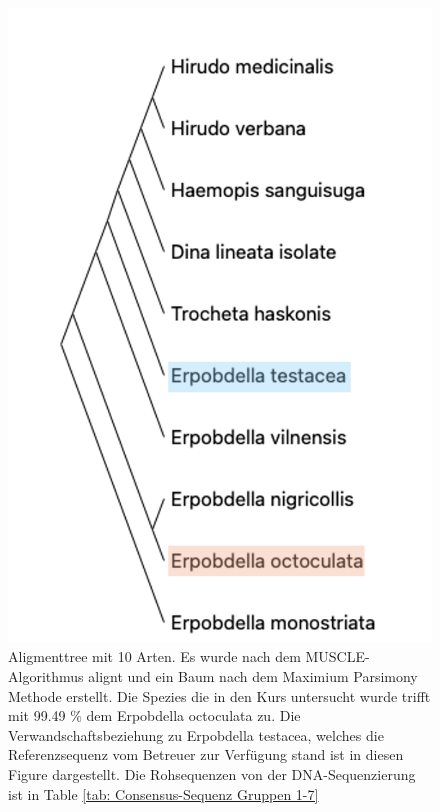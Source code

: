 \documentclass[oneside,10pt,a4paper]{report}
\begin{document}
				\begin{figure}[H]
					\centering
					\includegraphics[scale=0.7]{Anhs Tree.png}
					\caption{Aligmenttree mit 10 Arten. Es wurde nach dem MUSCLE-Algorithmus alignt und ein Baum nach dem Maximium Parsimony Methode erstellt. Die Spezies die in den Kurs untersucht wurde trifft mit 99.49 $\%$ dem Erpobdella octoculata zu. Die Verwandschaftsbeziehung zu Erpobdella testacea, welches die Referenzsequenz vom Betreuer zur Verfügung stand ist in diesen Figure dargestellt. Die Rohsequenzen von der DNA-Sequenzierung ist in Table \ref{tab: Consensus-Sequenz Gruppen 1-7}}
					\label{fig: Baum}
				\end{figure}
				
			
\end{document}
